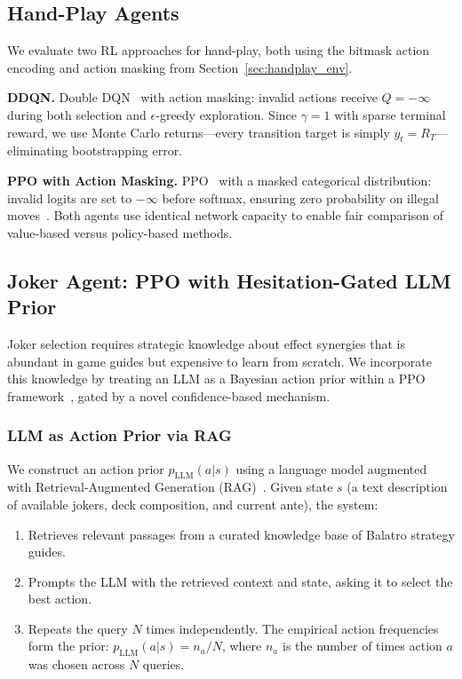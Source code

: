 \documentclass[conference]{IEEEtran}
\begin{document}
\subsection{Hand-Play Agents}
\label{sec:handplay_agents}

We evaluate two RL approaches for hand-play, both using the bitmask action encoding and action masking from Section~\ref{sec:handplay_env}.

\textbf{DDQN.} Double DQN~\cite{vanhasselt2016deep} with action masking: invalid actions receive $Q = -\infty$ during both selection and $\epsilon$-greedy exploration. Since $\gamma=1$ with sparse terminal reward, we use Monte Carlo returns---every transition target is simply $y_t = R_T$---eliminating bootstrapping error.

\textbf{PPO with Action Masking.} PPO~\cite{schulman2017proximal} with a masked categorical distribution: invalid logits are set to $-\infty$ before softmax, ensuring zero probability on illegal moves~\cite{huang2022closer}. Both agents use identical network capacity to enable fair comparison of value-based versus policy-based methods.

\subsection{Joker Agent: PPO with Hesitation-Gated LLM Prior}
\label{sec:llm_prior}

Joker selection requires strategic knowledge about effect synergies that is abundant in game guides but expensive to learn from scratch. We incorporate this knowledge by treating an LLM as a Bayesian action prior within a PPO framework~\cite{yan2024efficient}, gated by a novel confidence-based mechanism.

\subsubsection{LLM as Action Prior via RAG}

We construct an action prior $p_{\mathrm{LLM}}(a|s)$ using a language model augmented with Retrieval-Augmented Generation (RAG)~\cite{lewis2020retrieval}. Given state $s$ (a text description of available jokers, deck composition, and current ante), the system:
\begin{enumerate}
    \item Retrieves relevant passages from a curated knowledge base of Balatro strategy guides.
    \item Prompts the LLM with the retrieved context and state, asking it to select the best action.
    \item Repeats the query $N$ times independently. The empirical action frequencies form the prior: $p_{\mathrm{LLM}}(a|s) = n_a / N$, where $n_a$ is the number of times action $a$ was chosen across $N$ queries.
\end{enumerate}
\end{document}
